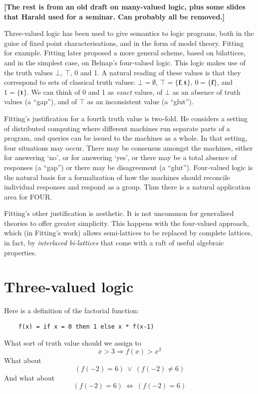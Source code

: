 \documentclass{llncs}
\newcommand{\false}{\ensuremath{\mathbf{f}}\xspace}
\newcommand{\true}{\ensuremath{\mathbf{t}}\xspace}
\newcommand{\impl}{\mathbin{\Rightarrow}}
\newcommand{\biim}{\mathbin{\Leftrightarrow}}
\begin{document}
\textbf{%
[The rest is from an old draft on many-valued logic, plus some slides 
that Harald used for a seminar. Can probably all be removed.]}

Three-valued logic has been used to give semantics to logic programs,
both in the guise of fixed point characterisations, and in the form
of model theory.
Fitting~\cite{Fitting:JLP85} for example.
Fitting later proposed a more general scheme, based on bilattices,
and in the simplest case, on Belnap's four-valued logic.
This logic makes use of the truth values $\bot$, $\top$, 0 and 1.
A natural reading of these values is that they correspond to sets
of classical truth values: $\bot = \emptyset$,
$\top = \{\false, \true\}$, $0 = \{\false\}$, and $1 = \{\true\}$.
We can think of 0 and 1 as \emph{exact} values, of $\bot$ as an
absence of truth values (a ``gap''), and of $\top$ as an inconsistent
value (a ``glut'').

Fitting's justification for a fourth truth value is two-fold.
He considers a setting of distributed computing where different
machines run separate parts of a program, and queries can be issued
to the machines as a whole.
In that setting, four situations may occur.
There may be consensus amongst the machines, either for answering
`no', or for answering `yes',
or there may be a total absence of responses (a ``gap'')
or there may be disagreement (a ``glut'').
Four-valued logic is the natural basis for a formalization of how
the machines should reconcile individual responses and respond as
a group.
Thus there is a natural application area for FOUR.

Fitting's other justification is aesthetic.
It is not uncommon for generalised theories to offer greater
simplicity.
This happens with the four-valued approach, which (in Fitting's
work) allows semi-lattices to be replaced by complete lattices,
in fact, by \emph{interlaced bi-lattices} that come with a raft
of useful algebraic properties.

\section{Three-valued logic}

Here is a definition of the factorial function:
\begin{verbatim}
    f(x) = if x = 0 then 1 else x * f(x-1)
\end{verbatim}
What sort of truth value should we assign to 
\[
  x > 3 \impl f(x) > x^2
\]
%
What about
\[
  (f(-2) = 6) ~ \lor ~ (f(-2) \not= 6)
\]
%
And what about
\[
  (f(-2) = 6) ~ \biim ~ (f(-2) = 6)
\]
\end{document}
